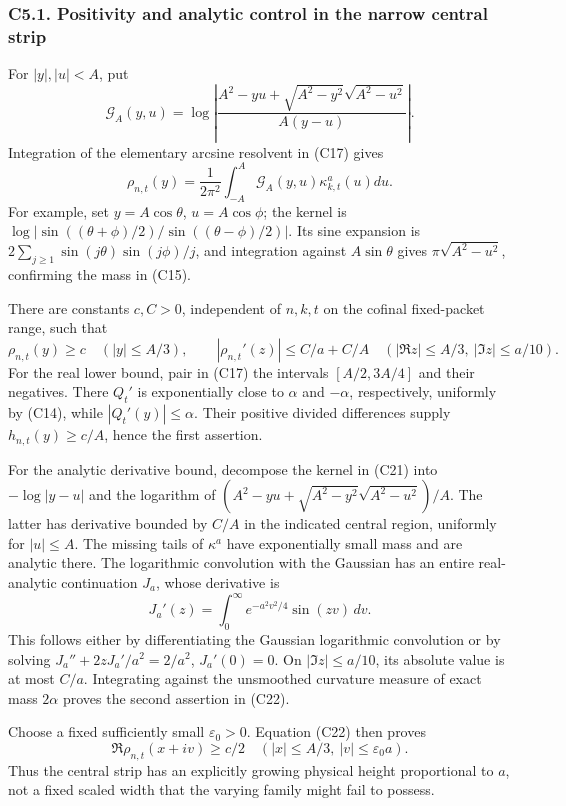 \documentclass[
  11pt,
]{article}
\begin{document}
\subsubsection{C5.1. Positivity and analytic control in the narrow
central
strip}\label{c5.1.-positivity-and-analytic-control-in-the-narrow-central-strip}

For \(|y|,|u|<A\), put \[
\mathcal G_A(y,u)=
\log\left|\frac{A^2-yu+\sqrt{A^2-y^2}\sqrt{A^2-u^2}}
{A(y-u)}\right|.
\] Integration of the elementary arcsine resolvent in (C17) gives \[
\rho_{n,t}(y)=\frac1{2\pi^2}\int_{-A}^A
\mathcal G_A(y,u)\kappa^a_{k,t}(u)du.\tag{C21}
\] For example, set \(y=A\cos\theta\), \(u=A\cos\phi\); the kernel is
\(\log|\sin((\theta+\phi)/2)/\sin((\theta-\phi)/2)|\). Its sine
expansion is \(2\sum_{j\ge1}\sin(j\theta)\sin(j\phi)/j\), and
integration against \(A\sin\theta\) gives \(\pi\sqrt{A^2-u^2}\),
confirming the mass in (C15).

There are constants \(c,C>0\), independent of \(n,k,t\) on the cofinal
fixed-packet range, such that \[
\rho_{n,t}(y)\ge c\quad(|y|\le A/3),
\qquad
|\rho_{n,t}'(z)|\le C/a+C/A
\quad(|\Re z|\le A/3,\ |\Im z|\le a/10).
\tag{C22}
\] For the real lower bound, pair in (C17) the intervals \([A/2,3A/4]\)
and their negatives. There \(Q_t'\) is exponentially close to \(\alpha\)
and \(-\alpha\), respectively, uniformly by (C14), while
\(|Q_t'(y)|\le\alpha\). Their positive divided differences supply
\(h_{n,t}(y)\ge c/A\), hence the first assertion.

For the analytic derivative bound, decompose the kernel in (C21) into
\(-\log|y-u|\) and the logarithm of
\((A^2-yu+\sqrt{A^2-y^2}\sqrt{A^2-u^2})/A\). The latter has derivative
bounded by \(C/A\) in the indicated central region, uniformly for
\(|u|\le A\). The missing tails of \(\kappa^a\) have exponentially small
mass and are analytic there. The logarithmic convolution with the
Gaussian has an entire real-analytic continuation \(J_a\), whose
derivative is \[
J_a'(z)=\int_0^\infty e^{-a^2v^2/4}\sin(zv)\,dv.
\] This follows either by differentiating the Gaussian logarithmic
convolution or by solving \(J_a''+2zJ_a'/a^2=2/a^2\), \(J_a'(0)=0\). On
\(|\Im z|\le a/10\), its absolute value is at most \(C/a\). Integrating
against the unsmoothed curvature measure of exact mass \(2\alpha\)
proves the second assertion in (C22).

Choose a fixed sufficiently small \(\varepsilon_0>0\). Equation (C22)
then proves \[
\Re\rho_{n,t}(x+iv)\ge c/2
\quad(|x|\le A/3,\ |v|\le\varepsilon_0a).\tag{C23}
\] Thus the central strip has an explicitly growing physical height
proportional to \(a\), not a fixed scaled width that the varying family
might fail to possess.
\end{document}
